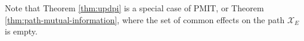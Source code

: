 \documentclass[../thesis.tex]{subfiles}
\begin{document}
Note that Theorem \ref{thm:updpi} is a special case of PMIT,
or Theorem \ref{thm:path-mutual-information}, where the
set of common effects on the path $\mathcal{X}_E$ is empty.

%
%
%
%
%
%
%
\end{document}
